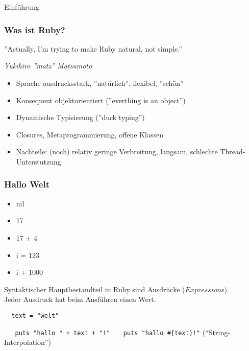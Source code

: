 \documentclass{beamer}
\begin{document}
\lstset{language=Ruby}
\lstset{basicstyle=\small,numbers=none, numberstyle=\tiny, numbersep=5pt}

\begin{frame}{Einführung}
\frametitle{Was ist Ruby?}

\begin{center}
''Actually, I'm trying to make Ruby natural, not simple.'' 
\end{center}
\begin{flushright}
\emph{Yukihiro ''matz'' Matsumoto}
\end{flushright}



\begin{itemize}
\pause \item Sprache ausdrucksstark\pause, ''natürlich''\pause, flexibel\pause, ''schön''
\pause \item Konsequent objektorientiert (''everthing is an object'')
\pause \item Dynamische Typisierung (''duck typing'')
\pause \item Closures, Metaprogrammierung, offene Klassen
\pause \item Nachteile: (noch) relativ geringe Verbreitung\pause,  langsam\pause, 
              schlechte Thread-Unterstutzung
\end{itemize}
\end{frame}

\begin{frame}[fragile]
  \frametitle{Hallo Welt}
  \begin{itemize}[<+->]
  \item nil
  \item 17
  \item 17 + 4
  \item i = 123
  \item i + 1000
  \end{itemize}
  \pause
  Syntaktischer Hauptbestandteil in Ruby sind Ausdrücke ($Expression$s).\\
  Jeder Ausdruck hat beim Ausführen einen Wert.\\
  \pause
  \begin{lstlisting}
  text = "welt"
  \end{lstlisting}
  \pause
  \lstinline|   puts "hallo " + text + "!"|
  \pause
  \lstinline|   puts "hallo #{text}!"| \hspace{5em}  (``String-Interpolation'')

\end{frame}
\end{document}

